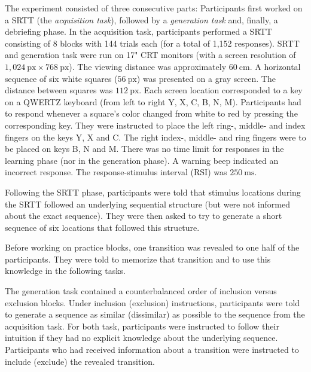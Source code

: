 \documentclass[floatsintext,man]{apa6}
\begin{document}
The experiment consisted of three consecutive parts: Participants first
worked on a SRTT (the \emph{acquisition task}), followed by a
\emph{generation task} and, finally, a debriefing phase. In the
acquisition task, participants performed a SRTT consisting of 8 blocks
with 144 trials each (for a total of 1,152 responses). SRTT and
generation task were run on 17" CRT monitors (with a screen resolution
of \(1{,}024~\text{px} \times 768~\text{px}\)). The viewing distance was
approximately \(60~\text{cm}\). A horizontal sequence of six white
squares (\(56~\text{px}\)) was presented on a gray screen. The distance
between squares was \(112~\text{px}\). Each screen location corresponded
to a key on a QWERTZ keyboard (from left to right Y, X, C, B, N, M).
Participants had to respond whenever a square's color changed from white
to red by pressing the corresponding key. They were instructed to place
the left ring-, middle- and index fingers on the keys Y, X and C. The
right index-, middle- and ring fingers were to be placed on keys B, N
and M. There was no time limit for responses in the learning phase (nor
in the generation phase). A warning beep indicated an incorrect
response. The response-stimulus interval (RSI) was \(250~\text{ms}\).

Following the SRTT phase, participants were told that stimulus locations
during the SRTT followed an underlying sequential structure (but were
not informed about the exact sequence). They were then asked to try to
generate a short sequence of six locations that followed this structure.

Before working on practice blocks, one transition was revealed to one
half of the participants. They were told to memorize that transition and
to use this knowledge in the following tasks.

The generation task contained a counterbalanced order of inclusion
versus exclusion blocks. Under inclusion (exclusion) instructions,
participants were told to generate a sequence as similar (dissimilar) as
possible to the sequence from the acquisition task. For both task,
participants were instructed to follow their intuition if they had no
explicit knowledge about the underlying sequence. Participants who had
received information about a transition were instructed to include
(exclude) the revealed transition.
\end{document}
